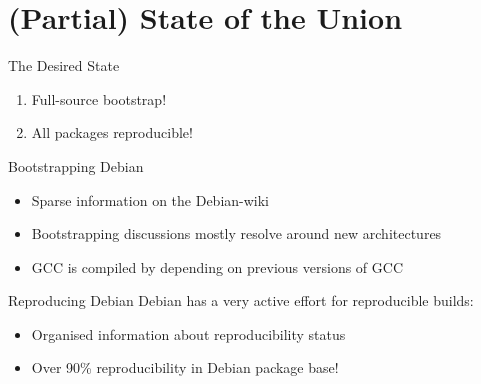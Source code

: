 \documentclass[12pt]{beamer}
\begin{document}
  \section{(Partial) State of the Union}

  \begin{frame}{The Desired State}
    \begin{center}
      \begin{enumerate}
      \item Full-source bootstrap!
      \item All packages reproducible!
      \end{enumerate}
    \end{center}
  \end{frame}

  \begin{frame}{Bootstrapping Debian}
    \begin{itemize}
    \item Sparse information on the Debian-wiki
    \item Bootstrapping discussions mostly resolve around new architectures
    \item GCC is compiled by depending on previous versions of GCC
    \end{itemize}
  \end{frame}

  \begin{frame}{Reproducing Debian}
    Debian has a very active effort for reproducible builds:

    \begin{itemize}
    \item Organised information about reproducibility status
    \item Over 90\% reproducibility in Debian package base!
    \end{itemize}
  \end{frame}
\end{document}
